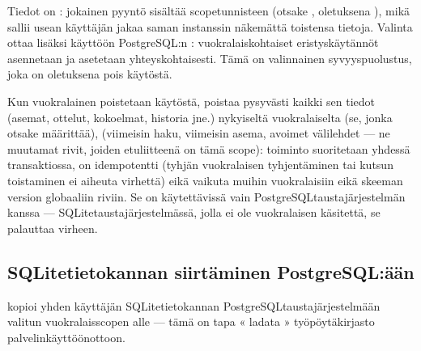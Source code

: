 \documentclass[letterpaper,10pt,finnish]{sphinxmanual}
\begin{document}
\sphinxAtStartPar
Tiedot on : jokainen pyyntö sisältää scope\sphinxhyphen{}tunnisteen (otsake , oletuksena ), mikä sallii usean käyttäjän jakaa saman instanssin näkemättä toistensa tietoja. Valinta  ottaa lisäksi käyttöön PostgreSQL:n : vuokralaiskohtaiset eristyskäytännöt asennetaan ja  asetetaan yhteyskohtaisesti. Tämä on valinnainen syvyyspuolustus, joka on oletuksena pois käytöstä.

\sphinxAtStartPar
Kun vuokralainen poistetaan käytöstä,  poistaa pysyvästi kaikki sen tiedot (asemat, ottelut, kokoelmat, historia jne.) nykyiseltä vuokralaiselta (se, jonka otsake  määrittää),  (viimeisin haku, viimeisin asema, avoimet välilehdet — ne muutamat \sphinxhyphen{}rivit, joiden etuliitteenä on tämä scope): toiminto suoritetaan yhdessä transaktiossa, on idempotentti (tyhjän vuokralaisen tyhjentäminen tai kutsun toistaminen ei aiheuta virhettä) eikä vaikuta muihin vuokralaisiin eikä skeeman version globaaliin riviin. Se on käytettävissä vain PostgreSQL\sphinxhyphen{}taustajärjestelmän kanssa — SQLite\sphinxhyphen{}taustajärjestelmässä, jolla ei ole vuokralaisen käsitettä, se palauttaa \sphinxhyphen{}virheen.


\subsection{SQLite\sphinxhyphen{}tietokannan siirtäminen PostgreSQL:ään}
\label{\detokenize{mode_headless:migrer-une-base-sqlite-vers-postgresql}}\label{\detokenize{mode_headless:headless-migrate}}
\sphinxAtStartPar
{} kopioi yhden käyttäjän SQLite\sphinxhyphen{}tietokannan PostgreSQL\sphinxhyphen{}taustajärjestelmään valitun vuokralais\sphinxhyphen{}scopen alle — tämä on tapa « ladata » työpöytäkirjasto palvelinkäyttöönottoon.
\end{document}
